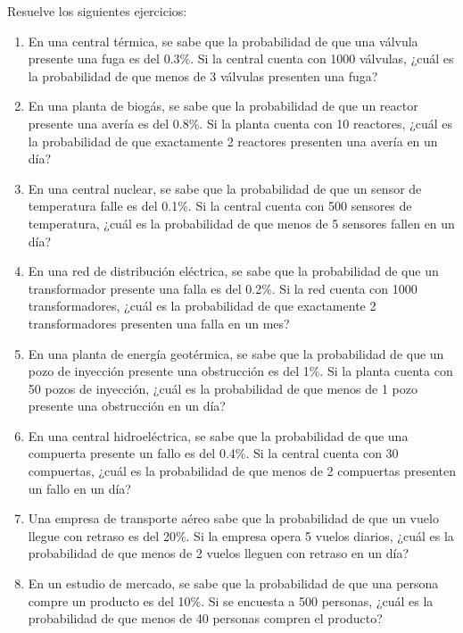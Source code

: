 \begin{Ejer}
Resuelve los siguientes ejercicios:
\begin{enumerate}

    \item En una central térmica, se sabe que la probabilidad de que una válvula presente una fuga es del 0.3\%. Si la central cuenta con 1000 válvulas, ¿cuál es la probabilidad de que menos de 3 válvulas presenten una fuga?

    \item En una planta de biogás, se sabe que la probabilidad de que un reactor presente una avería es del 0.8\%. Si la planta cuenta con 10 reactores, ¿cuál es la probabilidad de que exactamente 2 reactores presenten una avería en un día?

    \item En una central nuclear, se sabe que la probabilidad de que un sensor de temperatura falle es del 0.1\%. Si la central cuenta con 500 sensores de temperatura, ¿cuál es la probabilidad de que menos de 5 sensores fallen en un día?

    \item En una red de distribución eléctrica, se sabe que la probabilidad de que un transformador presente una falla es del 0.2\%. Si la red cuenta con 1000 transformadores, ¿cuál es la probabilidad de que exactamente 2 transformadores presenten una falla en un mes?

    \item En una planta de energía geotérmica, se sabe que la probabilidad de que un pozo de inyección presente una obstrucción es del 1\%. Si la planta cuenta con 50 pozos de inyección, ¿cuál es la probabilidad de que menos de 1 pozo presente una obstrucción en un día?

    \item En una central hidroeléctrica, se sabe que la probabilidad de que una compuerta presente un fallo es del 0.4\%. Si la central cuenta con 30 compuertas, ¿cuál es la probabilidad de que menos de 2 compuertas presenten un fallo en un día?

    \item Una empresa de transporte aéreo sabe que la probabilidad de que un vuelo llegue con retraso es del 20\%. Si la empresa opera 5 vuelos diarios, ¿cuál es la probabilidad de que menos de 2 vuelos lleguen con retraso en un día?

    \item En un estudio de mercado, se sabe que la probabilidad de que una persona compre un producto es del 10\%. Si se encuesta a 500 personas, ¿cuál es la probabilidad de que menos de 40 personas compren el producto?


\end{enumerate}
\end{Ejer}
